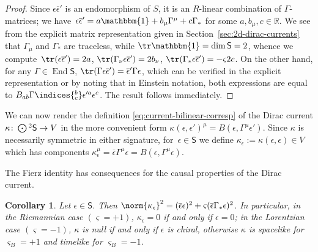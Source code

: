 \documentclass[pdftex]{sigma}
\numberwithin{equation}{section}
\newtheorem{Corollary}[Theorem]{Corollary}
\newcommand{\RR}{\mathbb{R}}
\newcommand{\ssS}{\mathsf{S}}
\newcommand{\Odot}{\mathchoice{{\textstyle\bigodot}}{\bigodot}{\bigodot}{\bigodot}}
\newcommand{\1}{\mathbbm{1}}
\DeclareMathOperator{\End}{End}
\begin{document}
\begin{proof}
	Since $\epsilon\overline\epsilon'$ is an endomorphism of $S$, it is an $R$-linear combination of $\Gamma$-matrices; we have~${
		\epsilon\overline\epsilon' = a\1 + b_\mu\Gamma^\mu + c\Gamma_*}
$
	for some $a,b_\mu,c\in\RR$. We see from the explicit matrix representation given in Section~\ref{sec:2d-dirac-currents} that $\Gamma_\mu$ and $\Gamma_*$ are traceless, while $\tr\1=\dim \ssS = 2$, whence we compute~${\tr(\epsilon\overline\epsilon') = 2a}$,	
$\tr(\Gamma_\nu\epsilon\overline\epsilon') = 2b_\nu$, $
		\tr(\Gamma_*\epsilon\overline\epsilon') = -\varsigma2c$.
	On the other hand, for any $\Gamma\in\End \ssS$, $\tr(\Gamma\epsilon\overline\epsilon')=\overline\epsilon'\Gamma\epsilon$, which can be verified in the explicit representation or by noting that in Einstein notation, both expressions are equal to $B_{ab}\Gamma\indices{^b_c}\epsilon'^a\epsilon^c$. The result follows immediately.
\end{proof}

We can now render the definition \eqref{eq:current-bilinear-corresp} of the Dirac current $\kappa\colon\Odot^2\ssS\to V$ in the more convenient form
$\kappa(\epsilon,\epsilon')^\mu = B(\epsilon,\Gamma^\mu\epsilon')$.
Since $\kappa$ is necessarily symmetric in either signature, for~$\epsilon\in \ssS$ we define $\kappa_\epsilon:=\kappa(\epsilon,\epsilon)\in V$ which has components
$
	\kappa_\epsilon^\mu=\overline\epsilon\Gamma^\mu\epsilon=B(\epsilon,\Gamma^\mu\epsilon)$.

The Fierz identity has consequences for the causal properties of the Dirac current.

\begin{Corollary}\label{coro:2d-dirac-causality}
	Let $\epsilon\in \ssS$. Then
$
		\norm{\kappa_\epsilon}^2 = (\overline\epsilon\epsilon)^2 + \varsigma(\overline\epsilon\Gamma_*\epsilon)^2$.
	In particular, in the Riemannian case $(\varsigma=+1)$, $\kappa_\epsilon=0$ if and only if $\epsilon=0$; in the Lorentzian case $(\varsigma=-1)$, $\kappa$ is null if and only if $\epsilon$ is chiral, otherwise $\kappa$ is spacelike for $\varsigma_B=+1$ and timelike for $\varsigma_B=-1$.
\end{Corollary}
\end{document}
